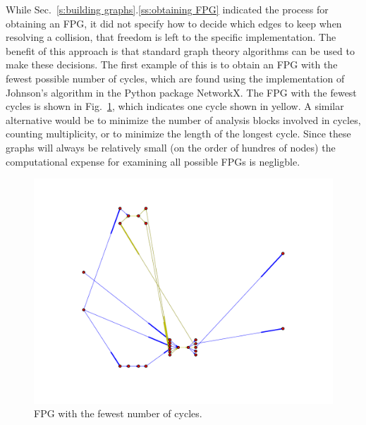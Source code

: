 	While Sec.~\ref{s:building graphs}.\ref{ss:obtaining FPG} indicated the process for obtaining an FPG, it did not specify how to decide which edges to keep when resolving a collision, that freedom is left to the specific implementation. 
	The benefit of this approach is that standard graph theory algorithms can be used to make these decisions. 
	The first example of this is to obtain an FPG with the fewest possible number of cycles, which are found using the implementation of Johnson's algorithm \cite{Johnson1975} in the Python package NetworkX. 
	The FPG with the fewest cycles is shown in Fig.~\ref{f:FPG fewest cycles}, which indicates one cycle shown in yellow. 
	A similar alternative would be to minimize the number of analysis blocks involved in cycles, counting multiplicity, or to minimize the length of the longest cycle. Since these graphs will always be relatively small (on the order of hundres of nodes) the 
	computational expense for examining all possible FPGs is negligble.
	\begin{figure}[htb!]
	  \begin{center}
		\includegraphics[width=.6\textwidth]{images/FPG_fewest_cycles}
	  \end{center}
	  \caption{FPG with the fewest number of cycles.}
	\label{f:FPG fewest cycles}
	\end{figure}

